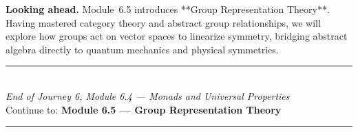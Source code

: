 \documentclass[12pt, a4paper]{article}
\begin{document}
\medskip
\noindent\textbf{Looking ahead.}
Module~6.5 introduces **Group Representation Theory**. Having mastered category theory and abstract group relationships, we will explore how groups act on vector spaces to linearize symmetry, bridging abstract algebra directly to quantum mechanics and physical symmetries.

\vspace{1.4cm}
\begin{center}
{\color{NavyBlue}\rule{0.5\linewidth}{0.8pt}}\\[6pt]
{\small\color{NavyBlue}\textit{End of Journey 6, Module 6.4 --- Monads and Universal Properties}}\\[4pt]
{\small\color{NavyBlue}Continue to: \textbf{Module 6.5 --- Group Representation Theory}}\\[6pt]
{\color{NavyBlue}\rule{0.5\linewidth}{0.8pt}}
\end{center}
\end{document}
